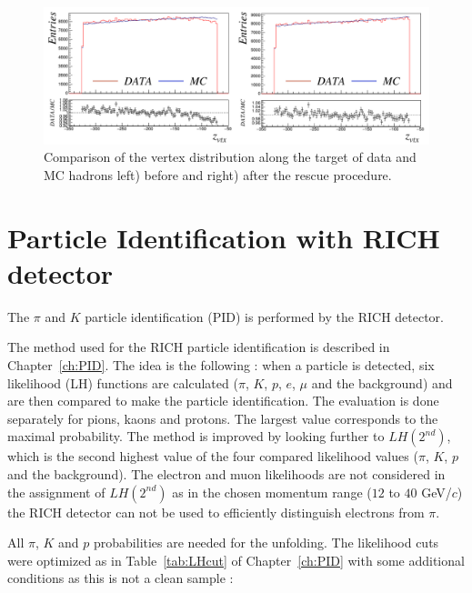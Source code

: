 \begin{figure}[!h]
	\includegraphics[scale=0.45]{./gfx/VertexDrop.png}
	\caption{Comparison of the vertex distribution along the target of data and MC hadrons left) before and right) after the rescue procedure.}
	\label{VertexDrop}
\end{figure}


\section{Particle Identification with RICH detector}

The $\pi$ and $K$ particle identification (PID) is performed by the RICH detector.

The method used for the RICH particle identification is described in Chapter~\ref{ch:PID}. The idea is the following : when a particle is detected, six likelihood (LH) functions are calculated ($\pi$, $K$, $p$, $e$, $\mu$ and the background) and are then compared to make the particle identification. The evaluation is done separately for pions, kaons and protons. The largest value corresponds to the maximal probability. The method is improved by looking further to $LH(2^{nd})$, which is the second highest value of the four compared likelihood values ($\pi$, $K$, $p$ and the background). The electron and muon likelihoods are not considered in the assignment of $LH(2^{nd})$ as in the chosen momentum range ($12$ to $40$ GeV/$c$) the RICH detector can not be used to efficiently distinguish electrons from $\pi$.

All $\pi$, $K$ and $p$ probabilities are needed for the unfolding. The likelihood cuts were optimized as in Table~\ref{tab:LHcut} of Chapter~\ref{ch:PID} with some additional conditions as this is not a clean sample :

